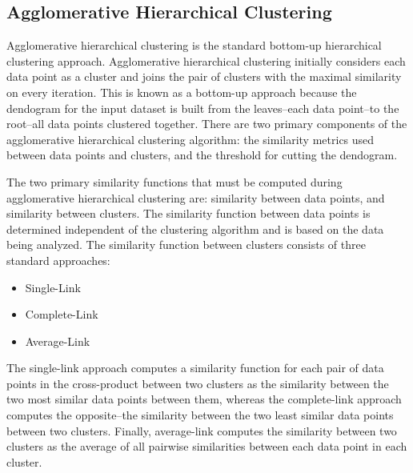 \documentclass[12pt]{ucthesis}
\begin{document}
      \subsection{Agglomerative Hierarchical Clustering}\label{sec:agglomerative}
         Agglomerative hierarchical clustering is the standard bottom-up
         hierarchical clustering approach. Agglomerative hierarchical
         clustering initially considers each data point as a cluster and joins
         the pair of clusters with the maximal similarity on every iteration.
         This is known as a bottom-up approach because the dendogram for the
         input dataset is built from the leaves--each data point--to the
         root--all data points clustered together. There are two primary
         components of the agglomerative hierarchical clustering algorithm: the
         similarity metrics used between data points and clusters, and the
         threshold for cutting the dendogram. 
         
         The two primary similarity functions that must be computed during
         agglomerative hierarchical clustering are: similarity between data
         points, and similarity between clusters. The similarity function
         between data points is determined independent of the clustering
         algorithm and is based on the data being analyzed. The similarity
         function between clusters consists of three standard approaches:
         \begin{itemize}
            \item Single-Link
            \item Complete-Link
            \item Average-Link
         \end{itemize}
         The single-link approach computes a similarity function for each pair
         of data points in the cross-product between two clusters as the
         similarity between the two most similar data points between them,
         whereas the complete-link approach computes the opposite--the
         similarity between the two least similar data points between two
         clusters. Finally, average-link computes the similarity between two
         clusters as the average of all pairwise similarities between each data
         point in each cluster.
\end{document}
